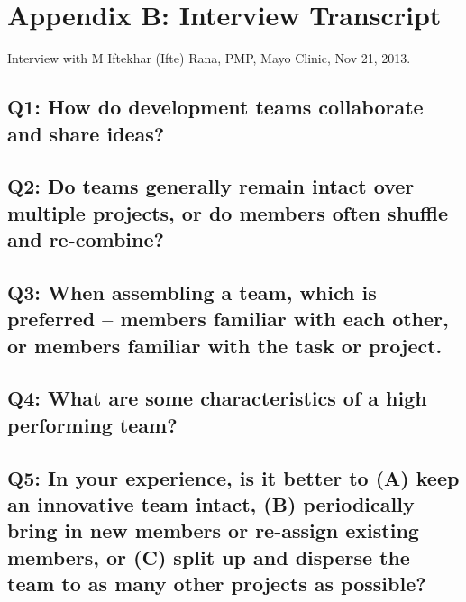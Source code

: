 \clearpage

\section*{Appendix B: Interview Transcript}
Interview with M Iftekhar (Ifte) Rana, PMP\textregistered, Mayo Clinic, Nov 21, 2013.

\subsection*{Q1: How do development teams collaborate and share ideas?}



\subsection*{Q2: Do teams generally remain intact over multiple projects, or do members often shuffle and re-combine?}



\subsection*{Q3: When assembling a team, which is preferred -- members familiar with each other, or members familiar with the task or project.}



\subsection*{Q4: What are some characteristics of a high performing team?}



\subsection*{Q5: In your experience, is it better to (A) keep an innovative team intact, (B) periodically bring in new members or re-assign existing members, or (C) split up and disperse the team to as many other projects as possible?}